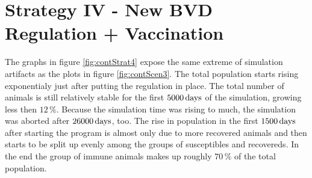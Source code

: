 \section{Strategy IV - New BVD Regulation + Vaccination}
The graphs in figure \ref{fig:contStrat4} expose the same extreme of simulation artifacts as the plots in figure \ref{fig:contScen3}. The total population starts rising exponentialy just after putting the regulation in place. The total number of animals is still relatively stable for the first $5000\,\text{days}$ of the simulation, growing less then $12\,\%$. Because the simulation time was rising to much, the simulation was aborted after $26000\,\text{days}$, too. The rise in population in the first $1500\,\text{days}$ after starting the program is almost only due to more recovered animals and then starts to be split up evenly among the groups of susceptibles and recovereds. In the end the group of immune animals makes up roughly $70\,\%$ of the total population.

